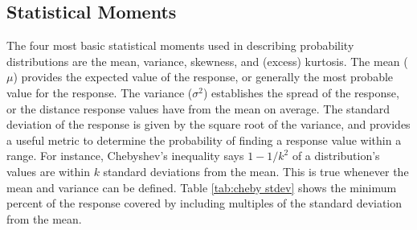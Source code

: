 \subsection{Statistical Moments}\label{sec:stat moments}
The four most basic statistical moments used in describing probability distributions are the mean, variance,
skewness, and (excess) kurtosis.
The mean ($\mu$) provides the expected value of the response, or generally the most probable
value for the response.  The variance ($\sigma^2$) establishes the spread of the response, or the distance response values
have from the mean on average.  The standard deviation of the response is given by the square root of the
variance, and provides a useful metric to determine the probability of finding a response value within a
range.  For instance, Chebyshev's inequality \cite{chebyshevineq} says $1-1/k^2$ of a distribution's values
are within $k$ standard deviations from the mean.  This is true whenever the mean and variance can be
defined.  Table
\ref{tab:cheby stdev} shows the minimum percent of the response covered by including multiples of the
standard deviation from the mean.

